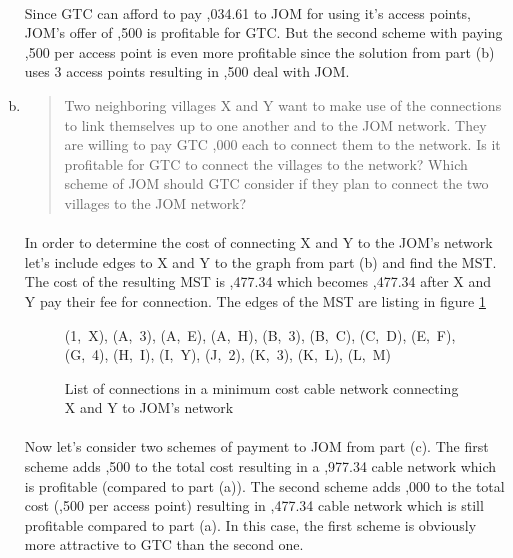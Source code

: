 \begin{enumerate}[(a)]
	\paragraph{}
	Since GTC can afford to pay ,034.61 to JOM for using it's access points, JOM's offer of ,500 is profitable for GTC. But the second scheme with paying ,500 per access point is even more profitable since the solution from part (b) uses 3 access points resulting in ,500 deal with JOM.

\item\begin{quote}Two neighboring villages X and Y want to make use of the connections to link themselves
up to one another and to the JOM network. They are willing to pay GTC
,000 each to connect them to the network.
Is it profitable for GTC to connect the villages to the network? Which scheme of
JOM should GTC consider if they plan to connect the two villages to the JOM
network?\end{quote}

	\paragraph{}
	In order to determine the cost of connecting X and Y to the JOM's network let's include edges to X and Y to the graph from part (b) and find the MST. The cost of the resulting MST is ,477.34 which becomes ,477.34 after X and Y pay their fee for connection. The edges of the MST are listing in figure \ref{mst2-6-d}

\begin{figure}[H]
	\centering
\begin{center}
(1,~X), (A,~3), (A,~E), (A,~H), (B,~3), (B,~C), (C,~D), (E,~F), (G,~4), (H,~I), (I,~Y), (J,~2), (K,~3), (K,~L), (L,~M)
\end{center}
	\caption{List of connections in a minimum cost cable network connecting X and Y to JOM's network}
	\label{mst2-6-d}
\end{figure}

	\paragraph{}
	Now let's consider two schemes of payment to JOM from part (c). The first scheme adds ,500 to the total cost resulting in a ,977.34 cable network which is profitable (compared to part (a)). The second scheme adds ,000 to the total cost (,500 per access point) resulting in ,477.34 cable network which is still profitable compared to part (a). In this case, the first scheme is obviously more attractive to GTC than the second one.

\end{enumerate}